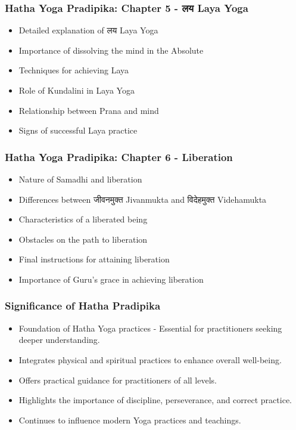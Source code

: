 \begin{frame}[fragile]\frametitle{Hatha Yoga Pradipika: Chapter 5 - लय  Laya Yoga}
\begin{itemize}
    \item Detailed explanation of लय  Laya Yoga
    \item Importance of dissolving the mind in the Absolute
    \item Techniques for achieving Laya
    \item Role of Kundalini in Laya Yoga
    \item Relationship between Prana and mind
    \item Signs of successful Laya practice
\end{itemize}
\end{frame}

\begin{frame}[fragile]\frametitle{Hatha Yoga Pradipika: Chapter 6 - Liberation}
\begin{itemize}
    \item Nature of Samadhi and liberation
    \item Differences between जीवनमुक्त  Jivanmukta and विदेहमुक्त  Videhamukta
    \item Characteristics of a liberated being
    \item Obstacles on the path to liberation
    \item Final instructions for attaining liberation
    \item Importance of Guru's grace in achieving liberation
\end{itemize}
\end{frame}

\begin{frame}[fragile]\frametitle{Significance of Hatha Pradipika}

      \begin{itemize}
		\item Foundation of Hatha Yoga practices - Essential for practitioners seeking deeper understanding.
		\item Integrates physical and spiritual practices to enhance overall well-being.
		\item Offers practical guidance for practitioners of all levels.
		\item Highlights the importance of discipline, perseverance, and correct practice.
		\item Continues to influence modern Yoga practices and teachings.
	  \end{itemize}

\end{frame}



